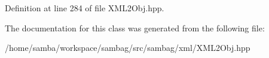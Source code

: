 Definition at line 284 of file XML2Obj.hpp.



The documentation for this class was generated from the following file:\begin{DoxyCompactItemize}
\item 
/home/samba/workspace/sambag/src/sambag/xml/XML2Obj.hpp\end{DoxyCompactItemize}
